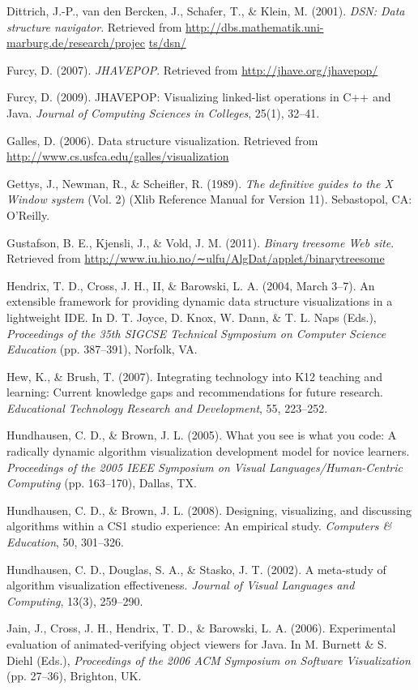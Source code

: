 \begin{chatext}
{Dittrich, J.-P., van den Bercken, J., Schafer, T., \& Klein, M. (2001). \textit{DSN: Data structure navigator}. Retrieved from \url{http://dbs.mathematik.uni-marburg.de/research/projec} \url{ts/dsn/}

Furcy, D. (2007). \textit{JHAVEPOP}. Retrieved from \url{http://jhave.org/jhavepop/}

Furcy, D. (2009). JHAVEPOP: Visualizing linked-list operations in C++ and Java. \textit{Journal of Computing Sciences in Colleges}, 25(1), 32–41.

Galles, D. (2006). Data structure visualization. Retrieved from \url{http://www.cs.usfca.edu/galles/visualization}

Gettys, J., Newman, R., \& Scheifler, R. (1989). \textit{The definitive guides to the X Window system} (Vol. 2) (Xlib Reference Manual for Version 11). Sebastopol, CA: O’Reilly.

Gustafson, B. E., Kjensli, J., \& Vold, J. M. (2011). \textit{Binary treesome Web site}. Retrieved from \url{http://www.iu.hio.no/∼ulfu/AlgDat/applet/binarytreesome}

Hendrix, T. D., Cross, J. H., II, \& Barowski, L. A. (2004, March 3–7). An extensible framework for providing dynamic data structure visualizations in a lightweight IDE. In D. T. Joyce, D. Knox, W. Dann, \& T. L. Naps (Eds.), \textit{Proceedings of the 35th SIGCSE Technical Symposium on Computer Science Education} (pp. 387–391), Norfolk, VA.

Hew, K., \& Brush, T. (2007). Integrating technology into K12 teaching and learning: Current knowledge gaps and recommendations for future research. \textit{Educational Technology Research and Development}, 55, 223–252.

Hundhausen, C. D., \& Brown, J. L. (2005). What you see is what you code: A radically dynamic algorithm visualization development model for novice learners. \textit{Proceedings of the 2005 IEEE Symposium on Visual Languages/Human-Centric Computing} (pp. 163–170), Dallas, TX.

Hundhausen, C. D., \& Brown, J. L. (2008). Designing, visualizing, and discussing algorithms within a CS1 studio experience: An empirical study. \textit{Computers \& Education}, 50, 301–326.

Hundhausen, C. D., Douglas, S. A., \& Stasko, J. T. (2002). A meta-study of algorithm visualization effectiveness. \textit{Journal of Visual Languages and Computing}, 13(3), 259–290.

Jain, J., Cross, J. H., Hendrix, T. D., \& Barowski, L. A. (2006). Experimental evaluation of animated-verifying object viewers for Java. In M. Burnett \& S. Diehl (Eds.), \textit{Proceedings of the 2006 ACM Symposium on Software Visualization} (pp. 27–36),
Brighton, UK.

}
\end{chatext}
